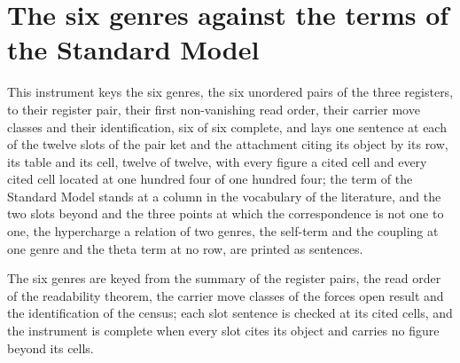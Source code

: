\section{The six genres against the terms of the Standard Model}\label{mod:I-2-D540373-the-six-genres-against-the-lagrangian-terms}
\begin{chtable}\label{box:I-2-D540373-the-six-genres-against-the-lagrangian-terms:1}
This instrument keys the six genres, the six unordered pairs of the three registers, to their register pair, their first non-vanishing read order, their carrier move classes and their identification, six of six complete, and lays one sentence at each of the twelve slots of the pair ket and the attachment citing its object by its row, its table and its cell, twelve of twelve, with every figure a cited cell and every cited cell located at one hundred four of one hundred four; the term of the Standard Model stands at a column in the vocabulary of the literature, and the two slots beyond and the three points at which the correspondence is not one to one, the hypercharge a relation of two genres, the self-term and the coupling at one genre and the theta term at no row, are printed as sentences.
\end{chtable}
The six genres are keyed from the summary of the register pairs, the read order of the readability theorem, the carrier move classes of the forces open result and the identification of the census; each slot sentence is checked at its cited cells, and the instrument is complete when every slot cites its object and carries no figure beyond its cells.

